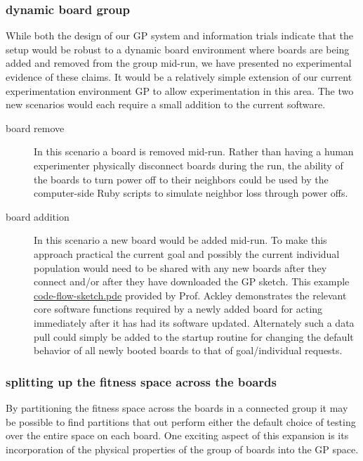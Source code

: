 \documentclass[11pt]{article}
\begin{document}
\subsubsection*{dynamic board group}
\label{sec-1.7.2}

While both the design of our GP system and information trials indicate
that the setup would be robust to a dynamic board environment where
boards are being added and removed from the group mid-run, we have
presented no experimental evidence of these claims.  It would be a
relatively simple extension of our current experimentation environment
GP to allow experimentation in this area.  The two new scenarios would
each require a small addition to the current software.

\begin{description}
\item[board remove] In this scenario a board is removed mid-run.  Rather
     than having a human experimenter physically disconnect boards
     during the run, the ability of the boards to turn power off to
     their neighbors could be used by the computer-side Ruby scripts
     to simulate neighbor loss through power offs.
\item[board addition] In this scenario a new board would be added
     mid-run.  To make this approach practical the current goal and
     possibly the current individual population would need to be
     shared with any new boards after they connect and/or after they
     have downloaded the GP sketch.  This example \href{file:///nfs/adaptive/eschulte/src/gp4ixm-report/src/code-flow-sketch.pde}{code-flow-sketch.pde}
     provided by Prof. Ackley demonstrates the relevant core software
     functions required by a newly added board for acting immediately
     after it has had its software updated.  Alternately such a data
     pull could simply be added to the startup routine for changing
     the default behavior of all newly booted boards to that of
     goal/individual requests.
\end{description}

\subsubsection*{splitting up the fitness space across the boards}
\label{sec-1.7.3}

By partitioning the fitness space across the boards in a connected
group it may be possible to find partitions that out perform either
the default choice of testing over the entire space on each board.
One exciting aspect of this expansion is its incorporation of the
physical properties of the group of boards into the GP space.
\end{document}
